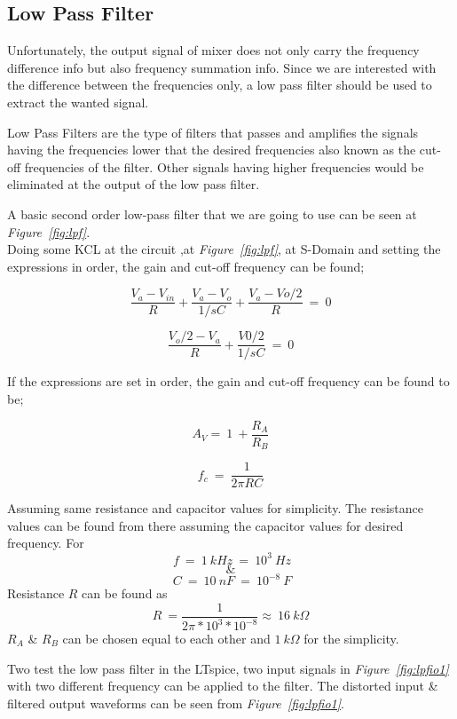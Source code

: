 \documentclass[paper]{IEEEtran}
\begin{document}
		
\subsection{Low Pass Filter}


	Unfortunately, the output signal of mixer does not only carry the frequency difference info but also frequency summation info. Since we are interested with the difference between the frequencies only, a low pass filter should be used to extract the wanted signal.

	Low Pass Filters are the type of filters that passes and amplifies the signals having the frequencies lower that the desired frequencies also known as the cut-off frequencies of the filter. Other signals having higher frequencies would be eliminated at the output of the low pass filter. 	

	A basic second order low-pass filter that we are going to use can be seen at \textit{Figure~\ref{fig:lpf}}. 	\\
	 

	
	Doing some KCL at the circuit ,at \textit{Figure~\ref{fig:lpf}}, at S-Domain and setting the expressions in order, the gain and cut-off frequency can be found;
	
	
	$$ \frac{V_a - V_{in}}{R}+\frac{V_a-V_o}{1/sC}+\frac{V_a-Vo/2}{R} ~=~0$$
	
	$$ \frac{V_o/2-V_a}{R}+\frac{V0/2}{1/sC} ~=~0	 $$
	
	If the expressions are set in order, the gain and cut-off frequency can be found to be;
	
	$$ A_V = ~1~+ \frac{R_A}{R_B} $$

	$$	f_c ~=~ \frac{1}{2\pi RC}	$$
	
	Assuming same resistance and capacitor values for simplicity. The resistance values can be found from there assuming the capacitor values for desired frequency. For 
	$$~f~=~1~kHz~=~10^3~Hz $$ 
	$$ \& $$ 
	$$~C~=~10~nF~=~10^{-8}~F$$
	Resistance $R$ can be found as
	$$ R~=\frac{1}{2\pi*10^3*10^{-8}}\approx~16~k\Omega $$
	$R_A$ \& $R_B$ can be chosen equal to each other and $1~k\Omega$ for the simplicity.

	 Two test the low pass filter in the LTspice, two input signals in \textit{Figure~\ref{fig:lpfio1}} with two different frequency can be applied to the filter. The distorted input \& filtered output waveforms can be seen from \textit{Figure~\ref{fig:lpfio1}}.
\end{document}
